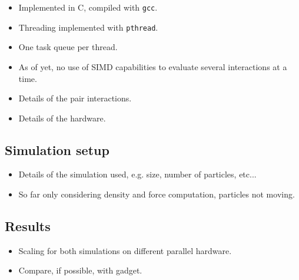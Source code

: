 \documentclass[final]{siamltex}
\begin{document}
\begin{itemize}

    \item Implemented in C, compiled with {\tt gcc}.

    \item Threading implemented with {\tt pthread}.

    \item One task queue per thread.
    
    \item As of yet, no use of SIMD capabilities to evaluate several
        interactions at a time.
    
    \item Details of the pair interactions.
    
    \item Details of the hardware.
        
\end{itemize}


\subsection{Simulation setup}

\begin{itemize}

    \item Details of the simulation used, e.g. size, number of particles,
        etc...
        
    \item So far only considering density and force computation,
        particles not moving.
        
\end{itemize}


\subsection{Results}

\begin{itemize}

    \item Scaling for both simulations on different parallel hardware.
    
    \item Compare, if possible, with {\sc gadget}.
        
\end{itemize}


\end{document}
